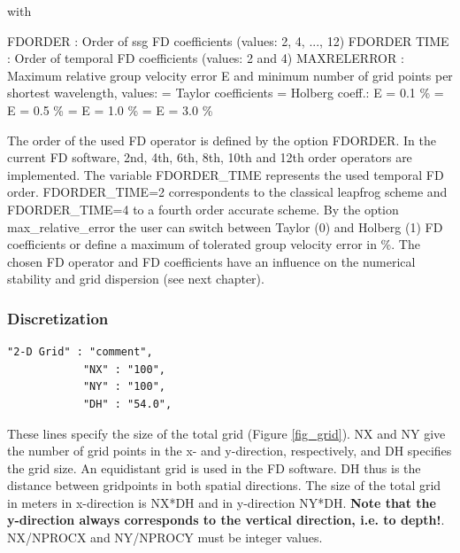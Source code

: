 \documentclass[11pt,onecolumn,oneside]{article}
\begin{document}
with 

FDORDER : Order of ssg FD coefficients (values: 2, 4, ..., 12)\newline
FDORDER TIME : Order of temporal FD coefficients (values: 2 and 4)\newline
MAXRELERROR : Maximum relative group velocity error E and minimum number of grid points per shortest wavelength, values: = Taylor coefficients = Holberg coeff.: E = 0.1 \%  =                 E = 0.5 \%  =                 E = 1.0 \%  =                 E = 3.0 \% \newline

The order of the used FD operator is defined by the option FDORDER. In the current FD software, 2nd, 4th, 6th, 8th, 10th and 12th order operators are implemented. The variable FDORDER\_TIME represents the used temporal FD order. FDORDER\_TIME=2 correspondents to the classical leapfrog scheme and FDORDER\_TIME=4 to a fourth order accurate scheme. By the option max\_relative\_error the user can switch between Taylor (0) and Holberg (1) FD coefficients or define a maximum of tolerated group velocity error in \%. The chosen FD operator and FD coefficients have an influence on the numerical stability and grid dispersion (see next chapter).

\subsubsection{Discretization}

\begin{verbatim}
"2-D Grid" : "comment",
			"NX" : "100",
			"NY" : "100",
			"DH" : "54.0",
\end{verbatim}

These lines specify the size of the total grid (Figure  \ref{fig_grid}). NX and NY give the number of grid points in the x- and y-direction, respectively, and DH specifies the grid size. An equidistant grid is used in the FD software. DH thus is the distance between gridpoints in both spatial directions. The size of the total grid in meters in x-direction is NX*DH and in y-direction NY*DH.
\textbf{Note that the y-direction always corresponds to the vertical direction, i.e. to depth!}. NX/NPROCX and NY/NPROCY must be integer values.
\end{document}
